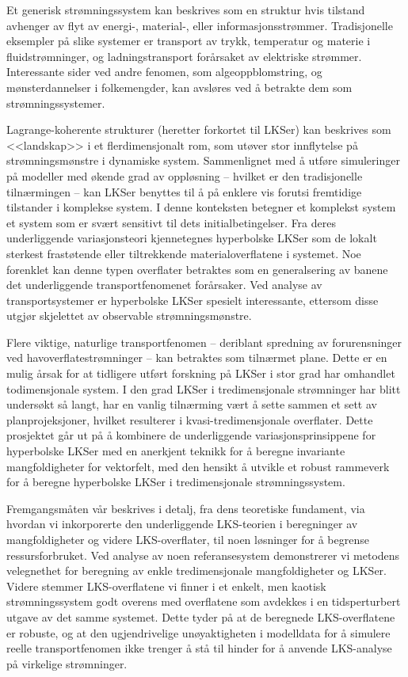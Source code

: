 Et generisk strømningssystem kan beskrives som en struktur hvis tilstand
avhenger av flyt av energi-, material-, eller informasjonsstrømmer.
Tradisjonelle eksempler på slike systemer er transport av trykk, temperatur og
materie i fluidstrømninger, og ladningstransport forårsaket av elektriske
strømmer. Interessante sider ved andre fenomen, som algeoppblomstring, og
mønsterdannelser i folkemengder, kan avsløres ved å betrakte dem som
strømningssystemer.

Lagrange-koherente strukturer (heretter forkortet til LKSer) kan beskrives som
<<landskap>> i et flerdimensjonalt rom, som utøver stor innflytelse på
strømningsmønstre i dynamiske system. Sammenlignet med å utføre simuleringer på
modeller med økende grad av oppløsning -- hvilket er den tradisjonelle
tilnærmingen -- kan LKSer benyttes til å på enklere vis forutsi fremtidige
tilstander i komplekse system. I denne konteksten betegner et komplekst system
et system som er svært sensitivt til dets initialbetingelser. Fra deres
underliggende variasjonsteori kjennetegnes hyperbolske LKSer som de lokalt
sterkest frastøtende eller tiltrekkende materialoverflatene i systemet. Noe
forenklet kan denne typen overflater betraktes som en generalsering av banene
det underliggende transportfenomenet forårsaker. Ved analyse av
transportsystemer er hyperbolske LKSer spesielt interessante, ettersom disse
utgjør skjelettet av observable strømningsmønstre.

Flere viktige, naturlige transportfenomen -- deriblant spredning av
forurensninger ved havoverflatestrømninger -- kan betraktes som
tilnærmet plane. Dette er en mulig årsak for at tidligere utført forskning på
LKSer i stor grad har omhandlet todimensjonale system. I den grad LKSer i
tredimensjonale strømninger har blitt undersøkt så langt, har en vanlig
tilnærming vært å sette sammen et sett av planprojeksjoner, hvilket resulterer
i kvasi-tredimensjonale overflater. Dette prosjektet går ut på å kombinere de
underliggende variasjonsprinsippene for hyperbolske LKSer med en anerkjent
teknikk for å beregne invariante mangfoldigheter for vektorfelt, med den
hensikt å utvikle et robust rammeverk for å beregne hyperbolske LKSer i
tredimensjonale strømningssystem.

Fremgangsmåten vår beskrives i detalj, fra dens teoretiske fundament, via
hvordan vi inkorporerte den underliggende LKS-teorien i beregninger av
mangfoldigheter og videre LKS-overflater, til noen løsninger for å begrense
ressursforbruket. Ved analyse av noen referansesystem demonstrerer vi metodens
velegnethet for beregning av enkle tredimensjonale mangfoldigheter og LKSer.
Videre stemmer LKS-overflatene vi finner i et enkelt, men kaotisk
strømningssystem godt overens med overflatene som avdekkes i en tidsperturbert
utgave av det samme systemet. Dette tyder på at de beregnede LKS-overflatene er
robuste, og at den ugjendrivelige unøyaktigheten i modelldata for å simulere
reelle transportfenomen ikke trenger å stå til hinder for å anvende LKS-analyse
på virkelige strømninger.

